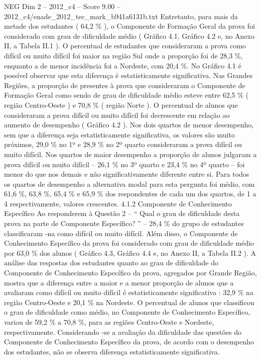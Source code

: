 \begin{textsample}{NEG Dim 2 – 2012\_c4 – Score 9.00 – 2012\_c4/enade\_2012\_tec\_mark\_b941a6131b.txt}
Entretanto, para mais da metade dos estudantes ( 64,2 \% ), o Componente de Formação Geral da prova foi considerado com grau de dificuldade médio ( Gráfico 4.1, Gráfico 4.2 e, no Anexo II, a Tabela II.1 ).
O percentual de estudantes que consideraram a prova como difícil ou muito difícil foi maior na região Sul onde a proporção foi de 28,3 \%, enquanto a de menor incidência foi a Nordeste, com 20,4 \%.
No Gráfico 4.1 é possível observar que esta diferença é estatisticamente significativa.
Nas Grandes Regiões, a proporção de presentes à prova que consideraram o Componente de Formação Geral como sendo de grau de dificuldade médio esteve entre 62,5 \% ( região Centro-Oeste ) e 70,8 \% ( região Norte ).
O percentual de alunos que consideraram a prova difícil ou muito difícil foi decrescente em relação ao aumento de desempenho ( Gráfico 4.2 ).
Nos dois quartos de menor desempenho, sem que a diferença seja estatisticamente significativa, os valores são muito próximos, 29,0 \% no 1º e 28,9 \% no 2º quarto consideraram a prova difícil ou muito difícil.
Nos quartos de maior desempenho a proporção de alunos julgaram a prova difícil ou muito difícil – 26,1 \% no 3º quarto e 23,4 \% no 4º quarto – foi menor do que nos demais e não significativamente diferente entre si.
Para todos os quartos de desempenho a alternativa modal para esta pergunta foi médio, com 61,6 \%, 63,8 \%, 65,4 \% e 65,9 \% dos respondentes de cada um dos quartos, de 1 a 4 respectivamente, valores crescentes. 4.1.2 Componente de Conhecimento Específico Ao responderem à Questão 2 – “ Qual o grau de dificuldade desta prova na parte de Componente Específico? ” – 28,4 \% do grupo de estudantes classificaram -na como difícil ou muito difícil.
Além disso, o Componente de Conhecimento Específico da prova foi considerado com grau de dificuldade médio por 63,0 \% dos alunos ( Gráfico 4.3, Gráfico 4.4 e, no Anexo II, a Tabela II.2 ).
A análise das respostas dos estudantes quanto ao grau de dificuldade do Componente de Conhecimento Específico da prova, agregados por Grande Região, mostra que a diferença entre a maior e a menor proporção de alunos que a avaliaram como difícil ou muito difícil é estatisticamente significativa : 32,9 \% na região Centro-Oeste e 20,1 \% na Nordeste.
O percentual de alunos que classificou o grau de dificuldade como médio, no Componente de Conhecimento Específico, variou de 59,2 \% a 70,8 \%, para as regiões Centro-Oeste e Nordeste, respectivamente.
Considerando -se a avaliação da dificuldade das questões do Componente de Conhecimento Específico da prova, de acordo com o desempenho dos estudantes, não se observa diferença estatisticamente significativa.

\end{textsample}
